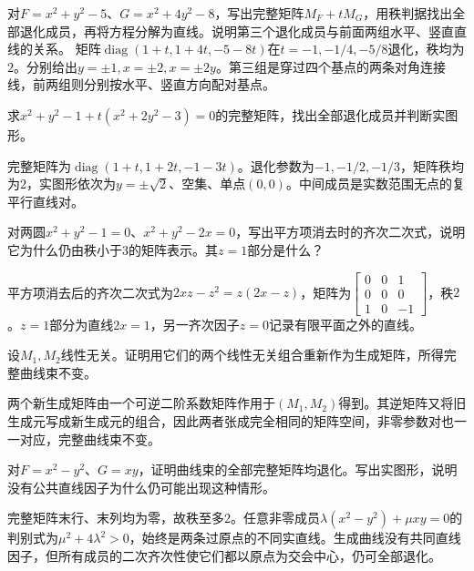对\(F=x^2+y^2-5\)、\(G=x^2+4y^2-8\)，写出完整矩阵\(M_F+tM_G\)，用秩判据找出全部退化成员，再将方程分解为直线。说明第三个退化成员与前面两组水平、竖直直线的关系。
\solutionanswer
矩阵\(\operatorname{diag}(1+t,1+4t,-5-8t)\)在\(t=-1,-1/4,-5/8\)退化，秩均为\(2\)。分别给出\(y=\pm1,x=\pm2,x=\pm2y\)。第三组是穿过四个基点的两条对角连接线，前两组则分别按水平、竖直方向配对基点。


求\(x^2+y^2-1+t(x^2+2y^2-3)=0\)的完整矩阵，找出全部退化成员并判断实图形。
\par
\solutionanswer
完整矩阵为\(\operatorname{diag}(1+t,1+2t,-1-3t)\)。退化参数为\(-1,-1/2,-1/3\)，矩阵秩均为\(2\)，实图形依次为\(y=\pm\sqrt2\)、空集、单点\((0,0)\)。中间成员是实数范围无点的复平行直线对。


对两圆\(x^2+y^2-1=0\)、\(x^2+y^2-2x=0\)，写出平方项消去时的齐次二次式，说明它为什么仍由秩小于\(3\)的矩阵表示。其\(z=1\)部分是什么？
\par
\solutionanswer
平方项消去后的齐次二次式为\(2xz-z^2=z(2x-z)\)，矩阵为\(\begin{bmatrix}0&0&1\\0&0&0\\1&0&-1\end{bmatrix}\)，秩\(2\)。\(z=1\)部分为直线\(2x=1\)，另一齐次因子\(z=0\)记录有限平面之外的直线。


设\(M_1,M_2\)线性无关。证明用它们的两个线性无关组合重新作为生成矩阵，所得完整曲线束不变。
\par
\solutionanswer
两个新生成矩阵由一个可逆二阶系数矩阵作用于\((M_1,M_2)\)得到。其逆矩阵又将旧生成元写成新生成元的组合，因此两者张成完全相同的矩阵空间，非零参数对也一一对应，完整曲线束不变。


对\(F=x^2-y^2\)、\(G=xy\)，证明曲线束的全部完整矩阵均退化。写出实图形，说明没有公共直线因子为什么仍可能出现这种情形。
\par
\solutionanswer
完整矩阵末行、末列均为零，故秩至多\(2\)。任意非零成员\(\lambda(x^2-y^2)+\mu xy=0\)的判别式为\(\mu^2+4\lambda^2>0\)，始终是两条过原点的不同实直线。生成曲线没有共同直线因子，但所有成员的二次齐次性使它们都以原点为交会中心，仍可全部退化。


